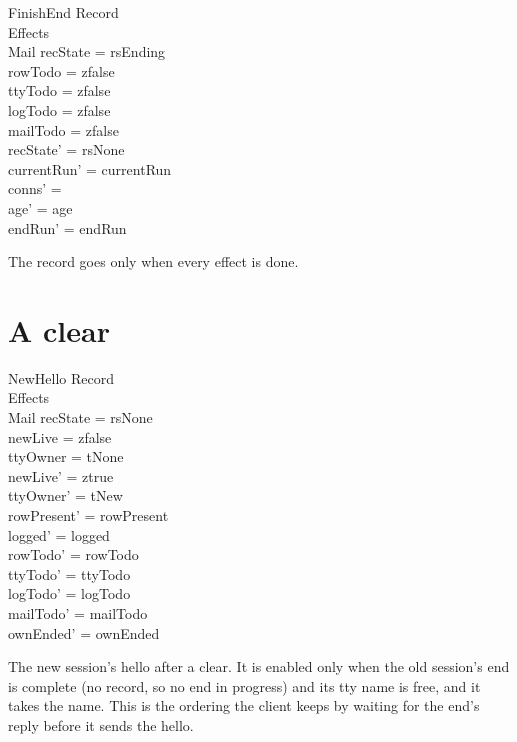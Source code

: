 \documentclass[a4paper,10pt,fleqn]{article}
\begin{document}
\begin{schema}{FinishEnd}
  \Delta Record \\
  \Xi Effects \\
  \Xi Mail
  \where
  recState = rsEnding \\
  rowTodo = zfalse \\
  ttyTodo = zfalse \\
  logTodo = zfalse \\
  mailTodo = zfalse \\
  recState' = rsNone \\
  currentRun' = currentRun \\
  conns' = \emptyset \\
  age' = age \\
  endRun' = endRun
\end{schema}

The record goes only when every effect is done.

\section{A clear}

\begin{schema}{NewHello}
  \Xi Record \\
  \Delta Effects \\
  \Xi Mail
  \where
  recState = rsNone \\
  newLive = zfalse \\
  ttyOwner = tNone \\
  newLive' = ztrue \\
  ttyOwner' = tNew \\
  rowPresent' = rowPresent \\
  logged' = logged \\
  rowTodo' = rowTodo \\
  ttyTodo' = ttyTodo \\
  logTodo' = logTodo \\
  mailTodo' = mailTodo \\
  ownEnded' = ownEnded
\end{schema}

The new session's hello after a clear.  It is enabled only when the old session's
end is complete (no record, so no end in progress) and its tty name is free, and it
takes the name.  This is the ordering the client keeps by waiting for the end's
reply before it sends the hello.
\end{document}
